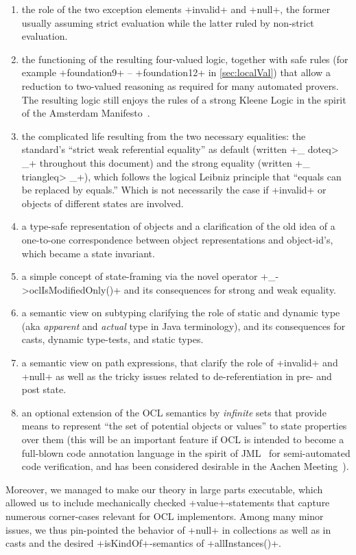 \begin{enumerate}
\item the role of the two exception elements \inlineisar+invalid+ and
  \inlineisar+null+, the former usually assuming strict evaluation
  while the latter ruled by non-strict evaluation.
\item the functioning of the resulting four-valued logic, together
  with safe rules (for example \inlineisar+foundation9+ --
  \inlineisar+foundation12+ in \autoref{sec:localVal}) that allow a
  reduction to two-valued reasoning as required for many automated
  provers. The resulting logic still enjoys the rules of a strong
  Kleene Logic in the spirit of the Amsterdam
  Manifesto~\cite{cook.ea::amsterdam:2002}.
\item the complicated life resulting from the two necessary
  equalities: the standard's ``strict weak referential equality'' as
  default (written \inlineisar+_ \<doteq> _+ throughout this document) and
  the strong equality (written \inlineisar+_ \<triangleq> _+), which
  follows the logical Leibniz principle that ``equals can be replaced
  by equals.''  Which is not necessarily the case if
  \inlineisar+invalid+ or objects of different states are involved.
\item a type-safe representation of objects and a clarification of the
  old idea of a one-to-one correspondence between object
  representations and object-id's, which became a state invariant.
\item a simple concept of state-framing via the novel operator
  \inlineocl+_->oclIsModifiedOnly()+ and its consequences for strong
  and weak equality.
\item a semantic view on subtyping clarifying the role of static and
  dynamic type (aka \emph{apparent} and \emph{actual} type in Java
  terminology), and its consequences for casts, dynamic type-tests,
  and static types.
\item a semantic view on path expressions, that clarify the role of
  \inlineisar+invalid+ and \inlineisar+null+ as well as the tricky
  issues related to de-referentiation in pre- and post state.
\item an optional extension of the OCL semantics by \emph{infinite}
  sets that provide means to represent ``the set of potential objects
  or values'' to state properties over them (this will be an important
  feature if OCL is intended to become a full-blown code annotation
  language in the spirit of JML~\cite{levens.ea:jml:2007} for semi-automated code verification,
  and has been considered desirable in the Aachen
  Meeting~\cite{brucker.ea:summary-aachen:2013}).
\end{enumerate}
Moreover, we managed to make our theory in large parts executable,
which allowed us to include mechanically checked
\inlineisar+value+-statements that capture numerous corner-cases
relevant for OCL implementors. Among many minor issues, we thus
pin-pointed the behavior of \inlineocl+null+ in collections as well
as in casts and the desired \inlineocl+isKindOf+-semantics of
\inlineocl+allInstances()+.


